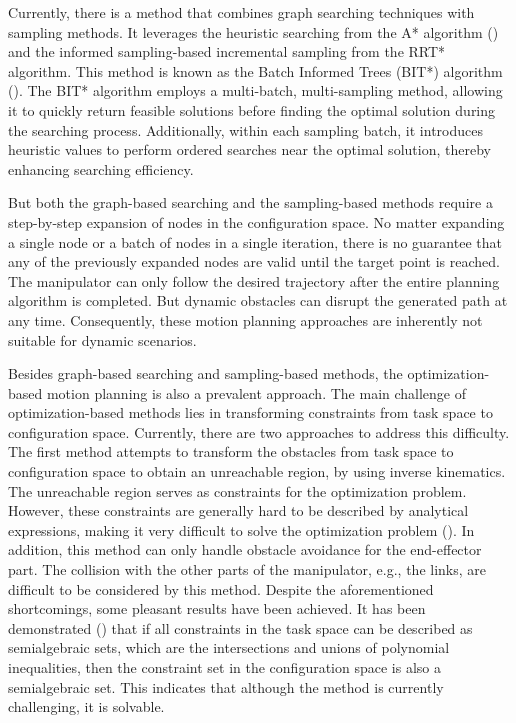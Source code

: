 Currently, there is a method that combines graph searching techniques with sampling methods. It leverages the heuristic searching from the A* algorithm (\cite{1968_TSSC_Astar}) and the informed sampling-based incremental sampling from the RRT* algorithm. This method is known as the Batch Informed Trees (BIT*) algorithm (\cite{2020_IJRR_BIT}). The BIT* algorithm employs a multi-batch, multi-sampling method, allowing it to quickly return feasible solutions before finding the optimal solution during the searching process. Additionally, within each sampling batch, it introduces heuristic values to perform ordered searches near the optimal solution, thereby enhancing searching efficiency.

But both the graph-based searching and the sampling-based methods require a step-by-step expansion of nodes in the configuration space. No matter expanding a single node or a batch of nodes in a single iteration, there is no guarantee that any of the previously expanded nodes are valid until the target point is reached. The manipulator can only follow the desired trajectory after the entire planning algorithm is completed. But dynamic obstacles can disrupt the generated path at any time. Consequently, these motion planning approaches are inherently not suitable for dynamic scenarios.

Besides graph-based searching and sampling-based methods, the optimization-based motion planning is also a prevalent approach. The main challenge of optimization-based methods lies in transforming constraints from task space to configuration space. Currently, there are two approaches to address this difficulty. The first method attempts to transform the obstacles from task space to configuration space to obtain an unreachable region, by using inverse kinematics. The unreachable region serves as constraints for the optimization problem. However, these constraints are generally hard to be described by analytical expressions, making it very difficult to solve the optimization problem (\cite{1988_canny_complexity}). In addition, this method can only handle obstacle avoidance for the end-effector part. The collision with the other parts of the manipulator, e.g., the links, are difficult to be considered by this method. Despite the aforementioned shortcomings, some pleasant results have been achieved. It has been demonstrated (\cite{2012_latombe_robot_motion_planning}) that if all constraints in the task space can be described as semialgebraic sets, which are the intersections and unions of polynomial inequalities, then the constraint set in the configuration space is also a semialgebraic set. This indicates that although the method is currently challenging, it is solvable.

